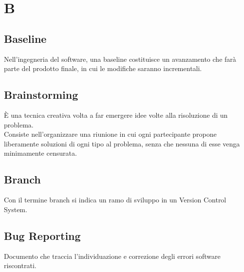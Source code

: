 \section{B}
	\subsection{Baseline}
		Nell'ingegneria del software, una baseline costituisce un avanzamento che farà parte del prodotto finale, in cui le modifiche saranno incrementali.
	\subsection{Brainstorming }  
		È una tecnica creativa volta a far emergere idee volte alla risoluzione di un problema. \\
		Consiste nell'organizzare una riunione in cui ogni partecipante propone liberamente soluzioni di ogni tipo al problema, senza che nessuna di esse venga minimamente censurata.
	\subsection{Branch}  
		Con il termine branch si indica un ramo di sviluppo in un Version Control System.
	\subsection{Bug Reporting}
        Documento che traccia l'individuazione e correzione degli errori software riscontrati.
\newpage